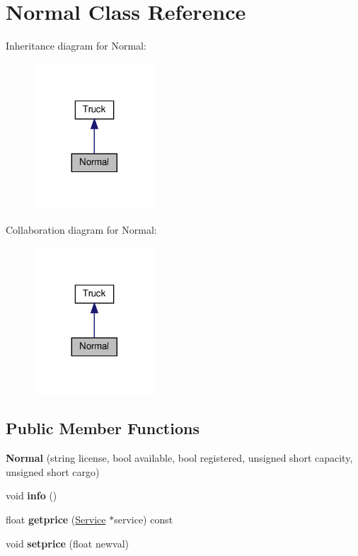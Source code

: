 \hypertarget{class_normal}{}\section{Normal Class Reference}
\label{class_normal}


Inheritance diagram for Normal\+:\nopagebreak
\begin{figure}[H]
\begin{center}
\leavevmode
\includegraphics[width=128pt]{class_normal__inherit__graph}
\end{center}
\end{figure}


Collaboration diagram for Normal\+:\nopagebreak
\begin{figure}[H]
\begin{center}
\leavevmode
\includegraphics[width=128pt]{class_normal__coll__graph}
\end{center}
\end{figure}
\subsection*{Public Member Functions}
\begin{DoxyCompactItemize}
\item 
\mbox{\label{class_normal_a5bfcd1d763c6cf56bdcf4de370903da7}} 
{\bfseries Normal} (string license, bool available, bool registered, unsigned short capacity, unsigned short cargo)
\item 
\mbox{\label{class_normal_ade6add2ee09e701113534c97e2a03307}} 
void {\bfseries info} ()
\item 
\mbox{\label{class_normal_aede7fcc331204acb77842e0ca436580e}} 
float {\bfseries getprice} (\hyperlink{class_service}{Service} $\ast$service) const
\item 
\mbox{\label{class_normal_a64dc32fa9341831f95ee8755d791b4e9}} 
void {\bfseries setprice} (float newval)
\end{DoxyCompactItemize}
